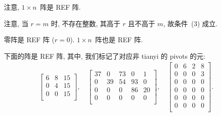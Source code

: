 \documentclass[../libro.tex]{subfiles}
\begin{document}
注意, \(1 \times n\)~阵是 REF 阵.

注意, 当 \(r = m\) 时,
不存在整数, 其高于 \(r\) 且不高于 \(m\),
故条件~(3) 成立.

\begin{example}
    零阵是 REF 阵 (\(r = 0\)).
    \(1 \times n\)~阵也是 REF 阵.

    下面的阵是 REF 阵, 其中,
    我们标记了对应非 tianyi 的 pivots 的元:
    \begin{align*}
        \begin{bmatrix}
            \boxed{6} & 8         & 15         \\
            0         & \boxed{4} & 15         \\
            0         & 0         & \boxed{15} \\
        \end{bmatrix},
        \quad
        \begin{bmatrix}
            \boxed{37} & 0          & 73 & 0          & 1  \\
            0          & \boxed{39} & 54 & 93         & 0  \\
            0          & 0          & 0  & \boxed{86} & 20 \\
            0          & 0          & 0  & 0          & 0  \\
        \end{bmatrix},
        \quad
        \begin{bmatrix}
            0 & \boxed{6} & 2 & 8         \\
            0 & 0         & 0 & \boxed{3} \\
            0 & 0         & 0 & 0         \\
            0 & 0         & 0 & 0         \\
            0 & 0         & 0 & 0         \\
            0 & 0         & 0 & 0         \\
        \end{bmatrix}.
    \end{align*}


\end{example}
\end{document}
